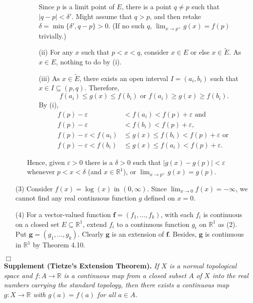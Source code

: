 \documentclass{article}
\begin{document}
\begin{enumerate}
\begin{enumerate}
\begin{enumerate}
    Since $p$ is a limit point of $E$,
    there is a point $q \neq p$ such that $|q - p| < \delta'$.
    Might assume that $q > p$, and then retake $\delta = \min\{\delta', q-p\} > 0$.
    (If no such $q$, $\lim_{x \to p^{+}} g(x) = f(p)$ trivially.)
    \item[(ii)]
    For any $x$ such that $p < x < q$,
    consider $x \in E$ or else $x \in \widetilde{E}$.
    As $x \in E$, nothing to do by (i).
    \item[(iii)]
    As $x \in \widetilde{E}$, there exists an open interval $I = (a_i, b_i)$
    such that $x \in I \subseteq (p,q)$.
    Therefore,
    $$f(a_i) \leq g(x) \leq f(b_i) \text{ or }
    f(a_i) \geq g(x) \geq f(b_i).$$
    By (i),
    \begin{align*}
      f(p) - \varepsilon &< f(a_i) < f(p) + \varepsilon \text{ and } \\
      f(p) - \varepsilon &< f(b_i) < f(p) + \varepsilon, \\
      f(p) - \varepsilon < f(a_i) &\leq g(x) \leq f(b_i) < f(p) + \varepsilon \text{ or } \\
      f(p) - \varepsilon < f(b_i) &\leq g(x) \leq f(a_i) < f(p) + \varepsilon.
    \end{align*}
    \end{enumerate}
  Hence, given $\varepsilon > 0$
  there is a $\delta > 0$ such that
  $|g(x) - g(p)| < \varepsilon$ whenever $p < x < \delta$ (and $x \in \mathbb{R}^1$),
  or $\lim_{x \to p^{+}} g(x) = g(p)$.
  \end{enumerate}
\item[(3)]
Consider $f(x) = \log(x)$ in $(0, \infty)$.
Since $\lim_{x \to 0} f(x) = -\infty$,
we cannot find any real continuous function $g$ defined on $x = 0$.
\item[(4)]
For a vector-valued function
$\mathbf{f} = (f_1, \ldots, f_k)$,
with each $f_i$ is continuous on a closed set $E \subseteq \mathbb{R}^1$,
extend $f_i$ to a continuous function $g_i$ on $\mathbb{R}^1$ as (2).
Put $\mathbf{g} = (g_1, \ldots, g_k)$.
Clearly $\mathbf{g}$ is an extension of $\mathbf{f}$.
Besides, $\mathbf{g}$ is continuous in $\mathbb{R}^1$ by Theorem 4.10.
\end{enumerate}
$\Box$ \\



\textbf{Supplement (Tietze's Extension Theorem).}
\emph{If $X$ is a normal topological space and
$f: A \to \mathbb{R}$ is a continuous map
from a closed subset $A$ of $X$ into the real numbers carrying the standard topology,
then there exists a continuous map
$g: X \to \mathbb{R}$ with $g(a) = f(a)$ for all $a \in A$.} \\\\
\end{document}
